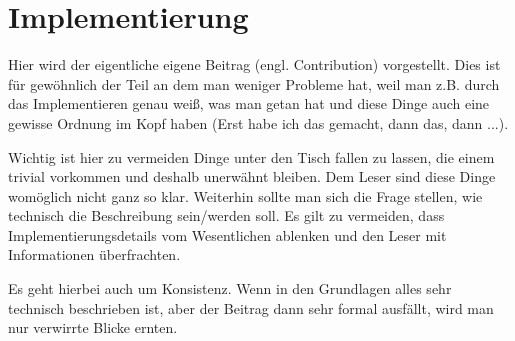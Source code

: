 
\chapter{Implementierung}\label{chapter:implementation}

Hier wird der eigentliche eigene Beitrag (engl. Contribution) vorgestellt. 
Dies ist für gewöhnlich der Teil an dem man weniger Probleme hat, weil man z.B. durch das Implementieren genau weiß, was man getan hat und diese Dinge auch eine gewisse Ordnung im Kopf haben (Erst habe ich das gemacht, dann das, dann ...).

Wichtig ist hier zu vermeiden Dinge unter den Tisch fallen zu lassen, die einem trivial vorkommen und deshalb unerwähnt bleiben. 
Dem Leser sind diese Dinge womöglich nicht ganz so klar. 
Weiterhin sollte man sich die Frage stellen, wie technisch die Beschreibung sein/werden soll. Es gilt zu vermeiden, dass Implementierungsdetails vom Wesentlichen ablenken und den Leser mit Informationen überfrachten.

Es geht hierbei auch um Konsistenz. 
Wenn in den Grundlagen alles sehr technisch beschrieben ist, aber der Beitrag dann sehr formal ausfällt, wird man nur verwirrte Blicke ernten.

